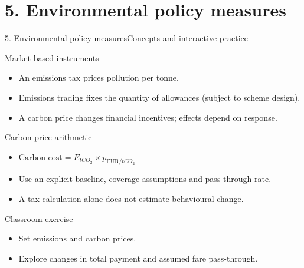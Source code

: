 \documentclass[aspectratio=169,11pt]{beamer}
\begin{document}
\section{5. Environmental policy measures}
\begin{frame}{5. Environmental policy measures}\centering\Large Concepts and interactive practice\end{frame}
\begin{frame}{Market-based instruments}\begin{itemize}
\item An emissions tax prices pollution per tonne.
\item Emissions trading fixes the quantity of allowances (subject to scheme design).
\item A carbon price changes financial incentives; effects depend on response.
\end{itemize}\end{frame}
\begin{frame}{Carbon price arithmetic}\begin{itemize}
\item $\text{Carbon cost}=E_{tCO_2}\times p_{\mathrm{EUR}/tCO_2}$
\item Use an explicit baseline, coverage assumptions and pass-through rate.
\item A tax calculation alone does not estimate behavioural change.
\end{itemize}\end{frame}
\begin{frame}{Classroom exercise}\begin{itemize}
\item Set emissions and carbon prices.
\item Explore changes in total payment and assumed fare pass-through.
\end{itemize}\end{frame}
\end{document}
